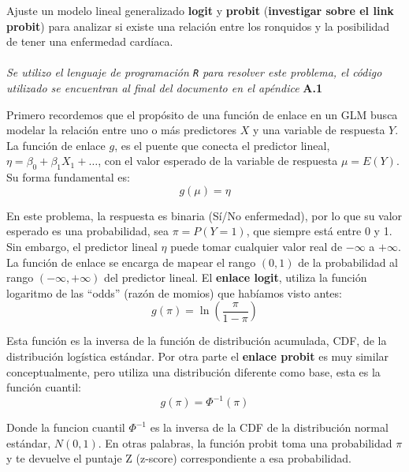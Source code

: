 Ajuste un modelo lineal generalizado \textbf{logit} y \textbf{probit} (\textbf{investigar sobre el link probit}) para analizar si existe una relación entre los ronquidos y la posibilidad de tener una enfermedad cardíaca.\\

\noindent{}\\

\textit{Se utilizo el lenguaje de programación \texttt{R} para resolver este problema, el código utilizado se encuentran al final del documento en el apéndice} \textbf{A.1}

Primero recordemos que el propósito de una función de enlace en un GLM busca modelar la relación entre uno o más predictores $X$ y una variable de respuesta $Y$. La función de enlace $g$, es el puente que conecta el predictor lineal, $\eta = \beta_0 + \beta_1X_1 + \dots$, con el valor esperado de la variable de respuesta $\mu = E(Y)$. Su forma fundamental es: 
\begin{equation}
    g(\mu) = \eta    
\end{equation}

En este problema, la respuesta es binaria (Sí/No enfermedad), por lo que su valor esperado es una probabilidad, sea $\pi = P(Y=1)$, que siempre está entre 0 y 1. Sin embargo, el predictor lineal $\eta$ puede tomar cualquier valor real de $-\infty$ a $+\infty$. La función de enlace se encarga de mapear el rango $(0, 1)$ de la probabilidad al rango $(-\infty, +\infty)$ del predictor lineal. El \textbf{enlace logit}, utiliza la función logaritmo de las ``odds'' (razón de momios) que habíamos visto antes: 
\begin{equation}
    g(\pi) = \ln\left(\frac{\pi}{1-\pi}\right)
\end{equation}
   
Esta función es la inversa de la función de distribución acumulada, CDF, de la distribución logística estándar. Por otra parte el \textbf{enlace probit} es muy similar conceptualmente, pero utiliza una distribución diferente como base, esta es la función cuantil:
\begin{equation}
    g(\pi) = \Phi^{-1}(\pi)
\end{equation}
    
Donde la funcion cuantil $\Phi^{-1}$ es la inversa de la CDF de la distribución normal estándar, $N(0, 1)$. En otras palabras, la función probit toma una probabilidad $\pi$ y te devuelve el puntaje Z (z-score) correspondiente a esa probabilidad.


